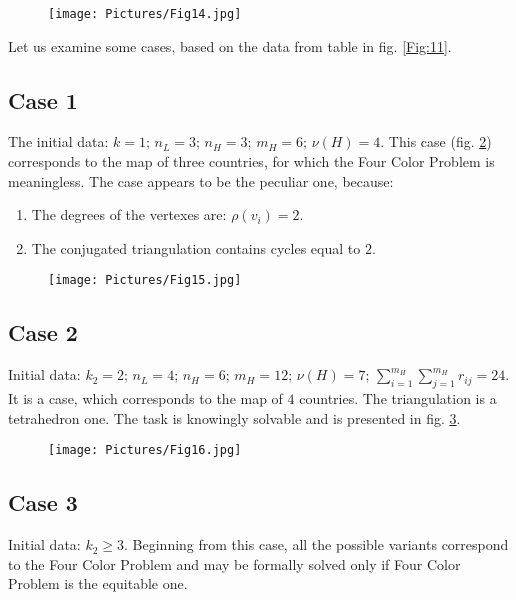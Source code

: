 \documentclass{amsart}
\theoremstyle{plain}
\numberwithin{equation}{section}
\begin{document}
\begin{figure}[htb]
		\texttt{[image: Pictures/Fig14.jpg]}
	\caption{}
	\label{Fig:14}
\end{figure}

Let us examine some cases, based on the data from table in fig. \ref {Fig:11}.

\subsection {Case 1}

The initial data: $k=1$; $n_L=3$; $n_H=3$; $m_H=6$; $\nu(H)=4$. 
This case (fig. \ref{Fig:15}) corresponds to the map of three countries, for which the Four Color Problem is meaningless. The case appears to be the peculiar one, because:

\begin{enumerate}
\item	
The degrees of the vertexes are: $\rho(v_i )=2$.
\item	
The conjugated triangulation contains cycles equal to $2$.
\end {enumerate}

\begin{figure}[htb]
		\texttt{[image: Pictures/Fig15.jpg]}
	\caption{}
	\label{Fig:15}
\end{figure}

\subsection {Case 2}

Initial data: $k_2=2$; $n_L=4$; $n_H=6$; $m_H=12$; $\nu(H)=7$; $\sum_{i=1}^{m_H}\sum_{j=1}^{m_H}r_{ij}=24$.  
It is a case, which corresponds to the map of $4$ countries. The triangulation is a tetrahedron one. The task is knowingly solvable and is presented in fig. \ref{Fig:16}.

\begin{figure}[htb]
	\texttt{[image: Pictures/Fig16.jpg]}
	\caption{}
	\label{Fig:16}
\end{figure}

\subsection {Case 3}

Initial data: $k_2 \ge 3$. 
Beginning from this case, all the possible variants correspond to the Four Color Problem and may be formally solved only if Four Color Problem is the equitable one.
\end{document}
